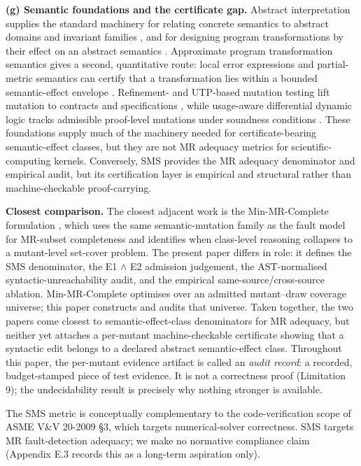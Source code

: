 \documentclass[manuscript,screen,review]{acmart}
\begin{document}
\textbf{(g) Semantic foundations and the certificate gap.} Abstract
interpretation supplies the standard machinery for relating concrete
semantics to abstract domains and invariant families \citep{cousot1992absint},
and for designing program transformations by their effect on an
abstract semantics \citep{cousot2002transform}. Approximate program
transformation semantics gives a second, quantitative route: local error
expressions and partial-metric semantics can certify that a
transformation lies within a bounded semantic-effect envelope \citep{westbrook2013approx,geoffroy2021partialmetric}. Refinement- and
UTP-based mutation testing lift mutation to contracts and
specifications \citep{aichernig2002contract,aichernig2007utp}, while
usage-aware differential dynamic logic tracks admissible proof-level
mutations under soundness conditions \citep{dotzel2023usageaware}. These foundations supply much of the machinery needed for
certificate-bearing semantic-effect classes, but they are not MR
adequacy metrics for scientific-computing kernels. Conversely, SMS
provides the MR adequacy denominator and empirical audit, but its
certification layer is empirical and structural rather than
machine-checkable proof-carrying.

\textbf{Closest comparison.} The closest adjacent work is the
Min-MR-Complete formulation \citep{li2026minmrcomplete}, which uses
the same semantic-mutation family as the fault model for MR-subset
completeness and identifies when class-level reasoning collapses to a
mutant-level set-cover problem. The present paper differs in role: it
defines the SMS denominator, the E1 $\wedge$ E2 admission judgement, the
AST-normalised syntactic-unreachability audit, and the empirical
same-source/cross-source ablation. Min-MR-Complete optimises over an
admitted mutant--draw coverage universe; this paper constructs and
audits that universe. Taken together, the two papers come closest to
semantic-effect-class denominators for MR adequacy, but neither yet
attaches a per-mutant machine-checkable certificate showing that a
syntactic edit belongs to a declared abstract semantic-effect class.
Throughout this paper, the per-mutant evidence artifact is called an
\emph{audit record}: a recorded, budget-stamped piece of test evidence.
It is not a correctness proof (Limitation 9); the
undecidability result is precisely why nothing stronger is available.

The SMS metric is conceptually complementary to the code-verification
scope of ASME V\&V 20-2009 §3, which targets numerical-solver
correctness. SMS targets MR fault-detection adequacy; we make no
normative compliance claim (Appendix E.3 records this as a long-term
aspiration only).
\end{document}
